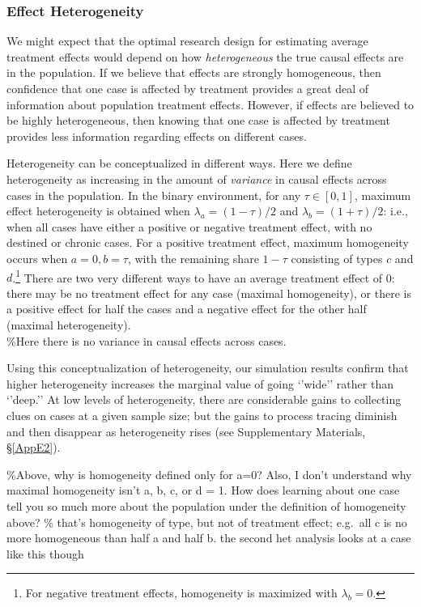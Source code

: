 \documentclass[12pt,]{book}
\let\rmarkdownfootnote\footnote%
\def\footnote{\protect\rmarkdownfootnote}
\begin{document}
\subsubsection{Effect Heterogeneity}

We might expect that the optimal research design for estimating average treatment effects would depend on how \emph{heterogeneous} the true causal effects are in the population. If we believe that effects are strongly homogeneous, then confidence that one case is affected by treatment provides a great deal of information about population treatment effects. However, if effects are believed to be highly heterogeneous, then knowing that one case is affected by treatment provides less information regarding effects on different cases.

Heterogeneity can be conceptualized in different ways. Here we define heterogeneity as increasing in the amount of \emph{variance} in causal effects across cases in the population. In the binary environment, for any \(\tau \in [0,1]\), maximum effect heterogeneity is obtained when \(\lambda_a=(1-\tau)/2\) and \(\lambda_b=(1+\tau)/2\): i.e., when all cases have either a positive or negative treatment effect, with no destined or chronic cases. For a positive treatment effect, maximum homogeneity occurs when \(a=0, b=\tau\), with the remaining share \(1-\tau\) consisting of types \(c\) and \(d\).\footnote{For negative treatment effects, homogeneity is maximized with \(\lambda_b=0\).} There are two very different ways to have an average treatment effect of 0: there may be no treatment effect for any case (maximal homogeneity), or there is a positive effect for half the cases and a negative effect for the other half (maximal heterogeneity).\\
\%Here there is no variance in causal effects across cases.

Using this conceptualization of heterogeneity, our simulation results confirm that higher heterogeneity increases the marginal value of going `'wide'' rather than `'deep.'' At low levels of heterogeneity, there are considerable gains to collecting clues on cases at a given sample size; but the gains to process tracing diminish and then disappear as heterogeneity rises (see Supplementary Materials, \S\ref{AppE2}).

\%Above, why is homogeneity defined only for a=0? Also, I don't understand why maximal homogeneity isn't a, b, c, or d = 1. How does learning about one case tell you so much more about the population under the definition of homogeneity above?
\% that's homogeneity of type, but not of treatment effect; e.g.~all c is no more homogeneous than half a and half b. the second het analysis looks at a case like this though
\end{document}
